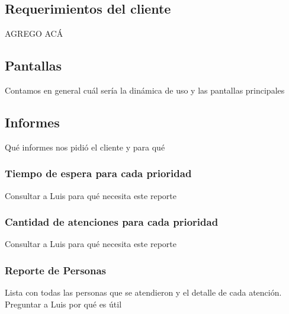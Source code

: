 \subsection{Requerimientos del cliente}
AGREGO ACÁ
\subsection{Pantallas}
Contamos en general cuál sería la dinámica de uso y las pantallas principales
\subsection{Informes}
Qué informes nos pidió el cliente y para qué
\subsubsection{Tiempo de espera para cada prioridad}
Consultar a Luis para qué necesita este reporte
\subsubsection{Cantidad de atenciones para cada prioridad}
Consultar a Luis para qué necesita este reporte
\subsubsection{Reporte de Personas}
Lista con todas las personas que se atendieron y el detalle de cada atención. Preguntar a Luis por qué es útil